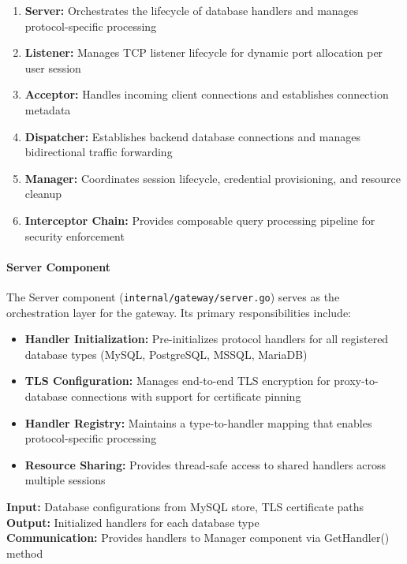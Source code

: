 \begin{enumerate}[leftmargin=*]
    \item \textbf{Server:} Orchestrates the lifecycle of database handlers and manages protocol-specific processing
    \item \textbf{Listener:} Manages TCP listener lifecycle for dynamic port allocation per user session
    \item \textbf{Acceptor:} Handles incoming client connections and establishes connection metadata
    \item \textbf{Dispatcher:} Establishes backend database connections and manages bidirectional traffic forwarding
    \item \textbf{Manager:} Coordinates session lifecycle, credential provisioning, and resource cleanup
    \item \textbf{Interceptor Chain:} Provides composable query processing pipeline for security enforcement
\end{enumerate}

\paragraph{Server Component}

The Server component (\texttt{internal/gateway/server.go}) serves as the orchestration layer for the gateway. Its primary responsibilities include:

\begin{itemize}[leftmargin=*]
    \item \textbf{Handler Initialization:} Pre-initializes protocol handlers for all registered database types (MySQL, PostgreSQL, MSSQL, MariaDB)
    \item \textbf{TLS Configuration:} Manages end-to-end TLS encryption for proxy-to-database connections with support for certificate pinning
    \item \textbf{Handler Registry:} Maintains a type-to-handler mapping that enables protocol-specific processing
    \item \textbf{Resource Sharing:} Provides thread-safe access to shared handlers across multiple sessions
\end{itemize}

\textbf{Input:} Database configurations from MySQL store, TLS certificate paths\\
\textbf{Output:} Initialized handlers for each database type\\
\textbf{Communication:} Provides handlers to Manager component via GetHandler() method

